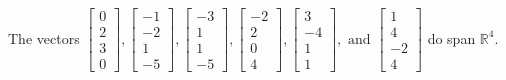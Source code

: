 \begin{exercise}
\begin{exerciseStatement}
  \end{exerciseStatement}
  \begin{exerciseAnswer}
   The vectors \(\left[\begin{array}{r}
0 \\
2 \\
3 \\
0
\end{array}\right] , \left[\begin{array}{r}
-1 \\
-2 \\
1 \\
-5
\end{array}\right] , \left[\begin{array}{r}
-3 \\
1 \\
1 \\
-5
\end{array}\right] , \left[\begin{array}{r}
-2 \\
2 \\
0 \\
4
\end{array}\right] , \left[\begin{array}{r}
3 \\
-4 \\
1 \\
1
\end{array}\right] , \text{ and } \left[\begin{array}{r}
1 \\
4 \\
-2 \\
4
\end{array}\right]\) 
  	 do  
	span \(\mathbb{R}^4\).
  


  \end{exerciseAnswer}
\end{exercise}